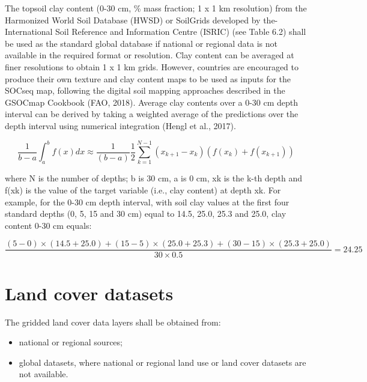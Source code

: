 \documentclass[
  10pt,
  b5paper,
]{book}
\providecommand{\tightlist}{%
  \setlength{\itemsep}{0pt}\setlength{\parskip}{0pt}}
\begin{document}
The topsoil clay content (0-30 cm, \% mass fraction; 1 x 1 km resolution) from the Harmonized World Soil Database (HWSD) or SoilGrids developed by the- International Soil Reference and Information Centre (ISRIC) (see Table 6.2) shall be used as the standard global database if national or regional data is not available in the required format or resolution. Clay content can be averaged at finer resolutions to obtain 1 x 1 km grids. However, countries are encouraged to produce their own texture and clay content maps to be used as inputs for the SOCseq map, following the digital soil mapping approaches described in the GSOCmap Cookbook (FAO, 2018).
Average clay contents over a 0-30 cm depth interval can be derived by taking a weighted average of the predictions over the depth interval using numerical integration (Hengl et al., 2017).

\begin{equation}
\tag{6.1}
\frac{1}{b-a} \int_{a}^{b} f(x) dx \approx \frac{1}{(b-a)} \frac{1}{2} \sum_{k=1}^{N-1}(x_{k+1} - x_{k})(f(x_{k}) + f(x_{k +1})) 
\end{equation}

where N is the number of depths; b is 30 cm, a is 0 cm, xk is the k-th depth and f(xk) is the value of the target variable (i.e., clay content) at depth xk. For example, for the 0-30 cm depth interval, with soil clay values at the first four standard depths (0, 5, 15 and 30 cm) equal to 14.5, 25.0, 25.3 and 25.0, clay content 0-30 cm equals:

\begin{equation}
\tag{6.2}
	\frac{(5-0) \times(14.5+25.0)+(15-5) \times(25.0 + 25.3) + (30 - 15) \times (25.3 + 25.0)} {30\times 0.5} = 24.25
\end{equation}

\hypertarget{land-cover-datasets}{%
\section{Land cover datasets}\label{land-cover-datasets}}

The gridded land cover data layers shall be obtained from:

\begin{itemize}
\tightlist
\item
  national or regional sources;
\item
  global datasets, where national or regional land use or land cover datasets are not available.
\end{itemize}
\end{document}
